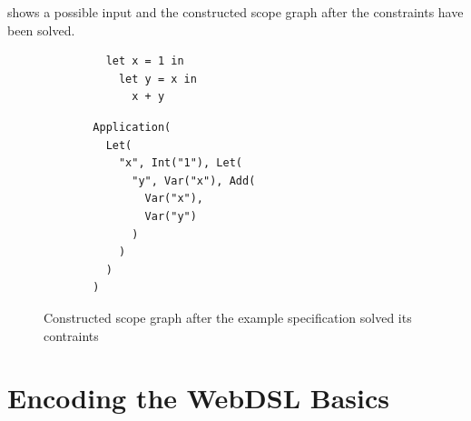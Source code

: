        shows a possible input and the constructed scope graph after the constraints have been solved.

      \begin{figure}[h]
        \begin{subfigure}[b]{0.33\textwidth}
          \begin{verbatim}
    let x = 1 in
      let y = x in
        x + y
          \end{verbatim}
          \caption{\label{fig:statix-let-binding-example-input}}
        \end{subfigure}
        \begin{subfigure}[b]{0.33\textwidth}
          \begin{verbatim}
  Application(
    Let(
      "x", Int("1"), Let(
        "y", Var("x"), Add(
          Var("x"),
          Var("y")
        )
      )
    )
  )
          \end{verbatim}
          \caption{\label{fig:statix-let-binding-example-term}}
        \end{subfigure}
        \begin{subfigure}[b]{0.33\textwidth}
          \centering
          \caption{\label{fig:statix-let-binding-example-sg}}
        \end{subfigure}
        \caption{\label{fig:statix-let-binding-example}Constructed scope graph after the example specification solved its contraints}
      \end{figure}

  \section{\label{sec:simple-type-systems}Encoding the WebDSL Basics}

